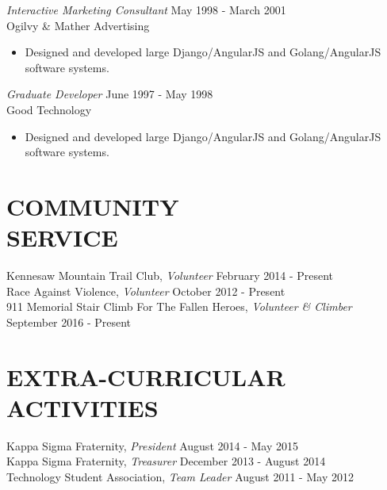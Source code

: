 \documentclass[margin, 10pt]{res} %
\begin{document}
\begin{resume}
        {\sl Interactive Marketing Consultant} \hfill May 1998 - March 2001\\
        Ogilvy & Mather Advertising
        \begin{itemize}
            \item Designed and developed large Django/AngularJS and Golang/AngularJS software systems.
        \end{itemize}

        {\sl Graduate Developer} \hfill June 1997 - May 1998\\
        Good Technology
        \begin{itemize}
            \item Designed and developed large Django/AngularJS and Golang/AngularJS software systems.
        \end{itemize}



        \section{COMMUNITY \\ SERVICE}

        Kennesaw Mountain Trail Club, {\sl Volunteer} \hfill February 2014 - Present \\
        Race Against Violence, {\sl Volunteer} \hfill October 2012 - Present \\
        9\/11 Memorial Stair Climb For The Fallen Heroes, {\sl Volunteer \& Climber} \hfill September 2016 - Present \\


        \section{EXTRA-CURRICULAR \\ ACTIVITIES}

        Kappa Sigma Fraternity, {\sl President} \hfill August 2014 - May 2015\\
        Kappa Sigma Fraternity, {\sl Treasurer} \hfill December 2013 - August 2014 \\
        Technology Student Association, {\sl Team Leader} \hfill August 2011 - May 2012 \\



    \end{resume}
\end{document}
